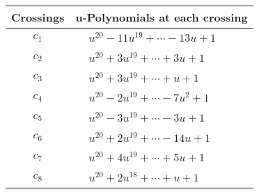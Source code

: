 \documentclass[1p]{elsarticle_modified}
\theoremstyle{definition}
\begin{document}
\begin{tabular}{m{50pt}|m{274pt}}
Crossings & \hspace{64pt}u-Polynomials at each crossing \\
\hline $$\begin{aligned}c_{1}\end{aligned}$$&$\begin{aligned}
&u^{20}-11 u^{19}+\cdots-13 u+1
\end{aligned}$\\
\hline $$\begin{aligned}c_{2}\end{aligned}$$&$\begin{aligned}
&u^{20}+3 u^{19}+\cdots+3 u+1
\end{aligned}$\\
\hline $$\begin{aligned}c_{3}\end{aligned}$$&$\begin{aligned}
&u^{20}+3 u^{19}+\cdots+u+1
\end{aligned}$\\
\hline $$\begin{aligned}c_{4}\end{aligned}$$&$\begin{aligned}
&u^{20}-2 u^{19}+\cdots-7 u^2+1
\end{aligned}$\\
\hline $$\begin{aligned}c_{5}\end{aligned}$$&$\begin{aligned}
&u^{20}-3 u^{19}+\cdots-3 u+1
\end{aligned}$\\
\hline $$\begin{aligned}c_{6}\end{aligned}$$&$\begin{aligned}
&u^{20}+2 u^{19}+\cdots-14 u+1
\end{aligned}$\\
\hline $$\begin{aligned}c_{7}\end{aligned}$$&$\begin{aligned}
&u^{20}+4 u^{19}+\cdots+5 u+1
\end{aligned}$\\
\hline $$\begin{aligned}c_{8}\end{aligned}$$&$\begin{aligned}
&u^{20}+2 u^{18}+\cdots+u+1
\end{aligned}$\\

\end{tabular}
\end{document}
